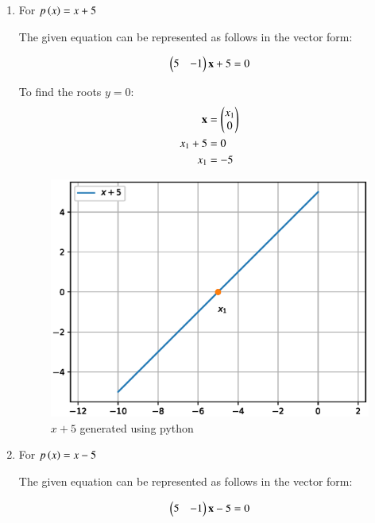 \renewcommand{\theequation}{\theenumi}
\begin{enumerate}

\item \solution For $p\left(x\right) = x + 5$ 
\begin{flushleft}
The given equation can be represented as follows in the vector form:
\end{flushleft}
\begin{align}
\begin{pmatrix}
5 & -1
\end{pmatrix}
\mathbf{x} + 5 = 0
\end{align}

To find the roots $y=0$: 
\begin{align}
\mathbf{x} &= \begin{pmatrix}x_1\\0\end{pmatrix} \\
x_1 + 5 &= 0 \\
x_1 &= -5
\end{align}
\begin{figure}[!ht]
\centering
\includegraphics[width=\columnwidth]{./figs/line_ex/lines_and_planes/eq1.eps}
\caption{$x + 5$ generated using python}
\label{fig:eq1_lines_and_planes}
\end{figure} 
\pagebreak
\item \solution For $p\left(x\right) = x - 5$
\begin{flushleft}
The given equation can be represented as follows in the vector form:
\end{flushleft}
\begin{align}
\begin{pmatrix}
5 & -1 
\end{pmatrix}
\mathbf{x} - 5 = 0
\end{align}


\end{enumerate}
